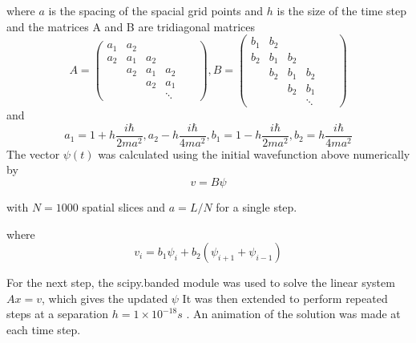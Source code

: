 \documentclass[11pt]{article}
\begin{document}
where $a$ is the spacing of the spacial grid points and $h$ is the size of the time step and the matrices A and B are tridiagonal matrices
   \begin{equation}
   	A = \begin{pmatrix}
   		a_{1} & a_{2}\\
   		 a_{2} & a_{1} & a_{2}&  \\
   		 & a_{2} & a_{1} & a_{2} & \\
   		 & & a_{2} & a_{1} & &\\
   		 & & & \ddots
   	\end{pmatrix}, 
   B = \begin{pmatrix}
   	b_{1} & b_{2}\\
   	b_{2} & b_{1} & b_{2}&  \\
   	& b_{2} & b_{1} & b_{2} & \\
   	& & b_{2} & b_{1} & &\\
   	& & & \ddots
   \end{pmatrix}
\label{eq5}
   \end{equation}
  and 
  \begin{equation}
  	a_{1} = 1 + h\frac{i\hbar}{2ma^{2}} , a_{2} -h\frac{i\hbar}{4ma^{2}}, b_{1} = 1-h\frac{i\hbar}{2ma^{2}}, b_{2} =h\frac{i\hbar}{4ma^{2}} 
  	\label{eq6}
  \end{equation}
	The vector $\psi(t)$ was calculated using the initial wavefunction above numerically by
	\begin{equation}
		v = B\psi
		\label{eq7}
	\end{equation}
	
	 with $N = 1000$ spatial slices and $a = L/N$ for a single step.
	
	where 
	\begin{equation}
		v_{i} = b_{1}\psi_{i} + b_{2}(\psi_{i + 1} + \psi_{i-1})
		\label{eq8}
	\end{equation}

	For the next step, the scipy.banded module was used to solve the linear system $A x = v$, which gives the updated $\psi$ 
	It was then extended to perform repeated steps at a separation $h = 1 \times 10^{-18} s$ .
    An animation of the solution was made at each time step.
	
\end{document}
